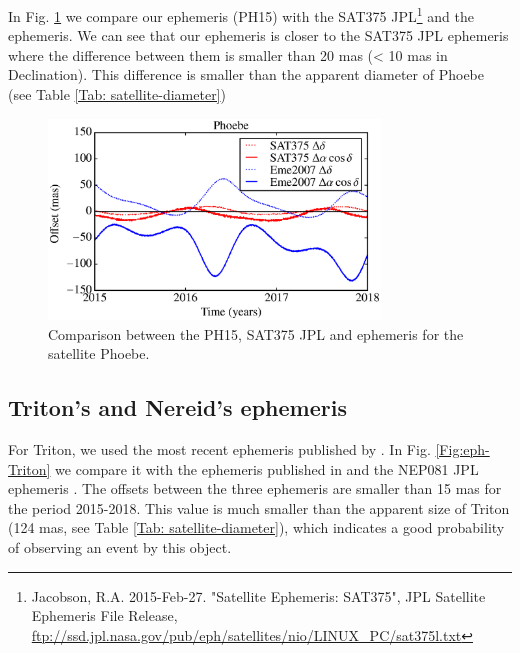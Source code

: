 In Fig. \ref{Fig:eph-Phoebe} we compare our ephemeris (PH15) with the SAT375 JPL\footnote{Jacobson, R.A. 2015-Feb-27. "Satellite Ephemeris: SAT375", JPL Satellite Ephemeris File Release, \url{ftp://ssd.jpl.nasa.gov/pub/eph/satellites/nio/LINUX_PC/sat375l.txt}} and the \cite{Emelyanov2007} ephemeris. We can see that our ephemeris is closer to the SAT375 JPL ephemeris where the difference between them is smaller than 20 mas (< 10 mas in Declination). This difference is smaller than the apparent diameter of Phoebe (see Table \ref{Tab: satellite-diameter})

\begin{figure}
\begin{centering}
\includegraphics[width=8.8cm]{figures/Phoebe.eps} 
\caption{Comparison between the PH15, SAT375 JPL and \cite{Emelyanov2007} ephemeris for the satellite Phoebe.}
\label{Fig:eph-Phoebe}
\end{centering}
\end{figure}

\subsection{Triton's and Nereid's ephemeris}

For Triton, we used the most recent ephemeris published by \cite{Emelyanov2015}. In Fig. \ref{Fig:eph-Triton} we compare it with the ephemeris published in \cite{Zhang2014} and the NEP081 JPL ephemeris \citep{Jacobson2009}. The offsets between the three ephemeris are smaller than 15 mas for the period 2015-2018. This value is much smaller than the apparent size of Triton (124 mas, see Table \ref{Tab: satellite-diameter}), which indicates a good probability of observing an event by this object.

